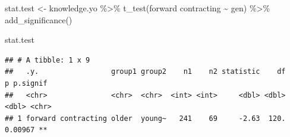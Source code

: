 \documentclass[
]{article}
\newenvironment{Shaded}{\begin{snugshade}}{\end{snugshade}}
\newcommand{\AttributeTok}[1]{\textcolor[rgb]{0.77,0.63,0.00}{#1}}
\newcommand{\FunctionTok}[1]{\textcolor[rgb]{0.00,0.00,0.00}{#1}}
\newcommand{\NormalTok}[1]{#1}
\newcommand{\OtherTok}[1]{\textcolor[rgb]{0.56,0.35,0.01}{#1}}
\newcommand{\SpecialCharTok}[1]{\textcolor[rgb]{0.00,0.00,0.00}{#1}}
\newcommand{\StringTok}[1]{\textcolor[rgb]{0.31,0.60,0.02}{#1}}
\begin{document}
\begin{Shaded}
\begin{Highlighting}[]
\NormalTok{stat.test }\OtherTok{\textless{}{-}}\NormalTok{ knowledge.yo }\SpecialCharTok{\%\textgreater{}\%}
    \FunctionTok{t\_test}\NormalTok{(}\StringTok{\textasciigrave{}}\AttributeTok{forward contracting}\StringTok{\textasciigrave{}} \SpecialCharTok{\textasciitilde{}}\NormalTok{ gen) }\SpecialCharTok{\%\textgreater{}\%}
    \FunctionTok{add\_significance}\NormalTok{()}

\NormalTok{stat.test}
\end{Highlighting}
\end{Shaded}

\begin{verbatim}
## # A tibble: 1 x 9
##   .y.                 group1 group2    n1    n2 statistic    df       p p.signif
##   <chr>               <chr>  <chr>  <int> <int>     <dbl> <dbl>   <dbl> <chr>   
## 1 forward contracting older  young~   241    69     -2.63  120. 0.00967 **
\end{verbatim}
\end{document}
